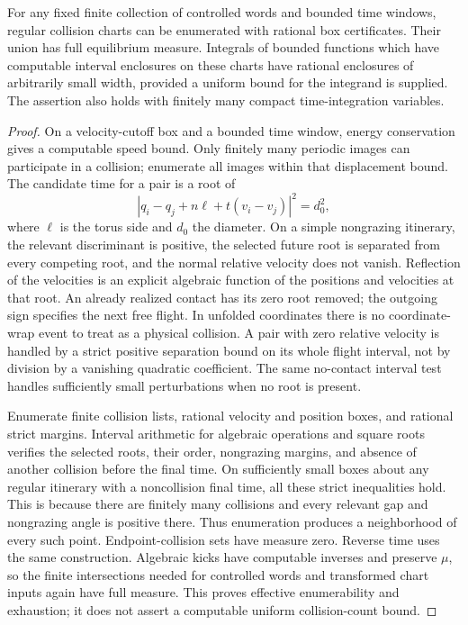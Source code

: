 \begin{lemma}
\label{lem:v15-charts}
For any fixed finite collection of controlled words and bounded time
windows, regular collision charts can be enumerated with rational box
certificates. Their union has full equilibrium measure. Integrals of
bounded functions which have computable interval enclosures on these
charts have rational enclosures of arbitrarily small width, provided
a uniform bound for the integrand is supplied. The assertion also
holds with finitely many compact time-integration variables.
\end{lemma}
\begin{proof}
On a velocity-cutoff box and a bounded time window, energy conservation
gives a computable speed bound. Only finitely many periodic images can
participate in a collision; enumerate all images within that displacement
bound. The candidate time for a pair is a root of
\[
 |q_i-q_j+n\ell+t(v_i-v_j)|^2=d_0^2,
\]
where $\ell$ is the torus side and $d_0$ the diameter. On a simple
nongrazing itinerary, the relevant discriminant is positive, the
selected future root is separated from every competing root, and the
normal relative velocity does not vanish. Reflection of the velocities
is an explicit algebraic function of the positions and velocities at
that root. An already realized contact has its zero root removed; the
outgoing sign specifies the next free flight. In unfolded coordinates
there is no coordinate-wrap event to treat as a physical collision.
A pair with zero relative velocity is handled by a strict positive
separation bound on its whole flight interval, not by division by a
vanishing quadratic coefficient. The same no-contact interval test
handles sufficiently small perturbations when no root is present.

Enumerate finite collision lists, rational velocity and position boxes,
and rational strict margins. Interval arithmetic for algebraic
operations and square roots verifies the selected roots, their order,
nongrazing margins, and absence of another collision before the final
time. On sufficiently small boxes about any regular itinerary with a
noncollision final time, all these strict inequalities hold. This is
because there are finitely many collisions and every relevant gap and
nongrazing angle is positive there. Thus enumeration produces a
neighborhood of every such point. Endpoint-collision sets have measure
zero. Reverse time uses the same construction. Algebraic kicks have
computable inverses and preserve $\mu$, so the finite intersections
needed for controlled words and transformed chart inputs again have
full measure. This proves effective enumerability and exhaustion; it
does not assert a computable uniform collision-count bound.


\end{proof}
